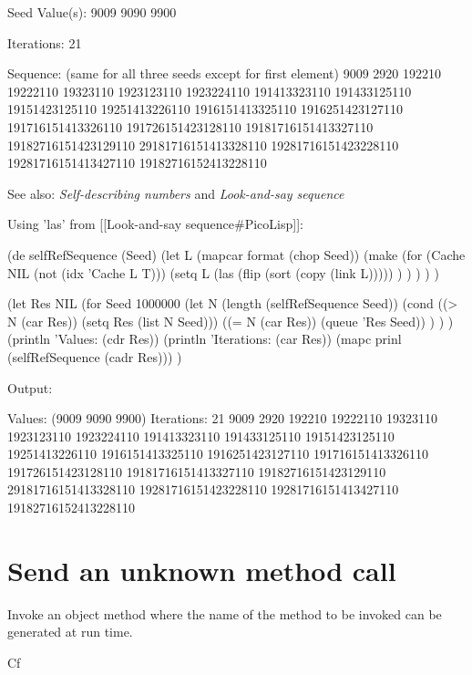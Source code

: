\begin{wideverbatim}
Seed Value(s): 9009 9090 9900

Iterations: 21 

Sequence: (same for all three seeds except for first element)
9009
2920
192210
19222110
19323110
1923123110
1923224110
191413323110
191433125110
19151423125110
19251413226110
1916151413325110
1916251423127110
191716151413326110
191726151423128110
19181716151413327110
19182716151423129110
29181716151413328110
19281716151423228110
19281716151413427110
19182716152413228110
\end{wideverbatim}

See also: \emph{Self-describing numbers} and \emph{Look-and-say
  sequence}


\begin{wideverbatim}

Using 'las' from [[Look-and-say sequence#PicoLisp]]:

(de selfRefSequence (Seed)
   (let L (mapcar format (chop Seed))
      (make
         (for (Cache NIL  (not (idx 'Cache L T)))
            (setq L
               (las (flip (sort (copy (link L))))) ) ) ) ) )

(let Res NIL
   (for Seed 1000000
      (let N (length (selfRefSequence Seed))
         (cond
            ((> N (car Res)) (setq Res (list N Seed)))
            ((= N (car Res)) (queue 'Res Seed)) ) ) )
   (println 'Values: (cdr Res))
   (println 'Iterations: (car Res))
   (mapc prinl (selfRefSequence (cadr Res))) )

Output:

Values: (9009 9090 9900)
Iterations: 21
9009
2920
192210
19222110
19323110
1923123110
1923224110
191413323110
191433125110
19151423125110
19251413226110
1916151413325110
1916251423127110
191716151413326110
191726151423128110
19181716151413327110
19182716151423129110
29181716151413328110
19281716151423228110
19281716151413427110
19182716152413228110

\end{wideverbatim}

\pagebreak{}
\section*{Send an unknown method call}

Invoke an object method where the name of the method to be invoked can
be generated at run time.

\begin{description}
\item[Cf]
\end{description}

